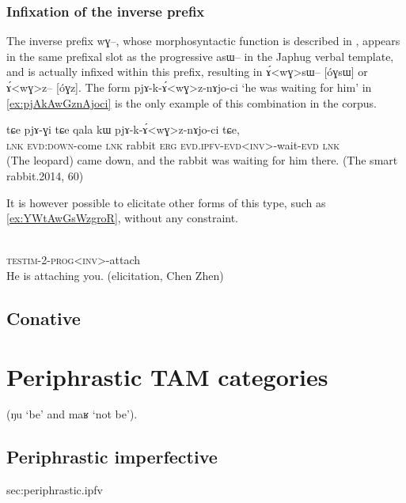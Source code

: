 \documentclass[oldfontcommands,oneside,a4paper,11pt]{article}
\newcommand{\ipa}[1]{{\phon \mbox{#1}}} %
\begin{document}
\subsubsection{Infixation of the inverse prefix}
The inverse prefix \ipa{wɣ--}, whose morphosyntactic function is described in \citet{jacques10inverse}, appears in the same prefixal slot as the progressive \ipa{asɯ--} in the Japhug verbal template, and is actually infixed within this prefix, resulting in \ipa{ɤ́<wɣ>sɯ--} [\ipa{óɣsɯ}] or \ipa{ɤ́<wɣ>z--} [\ipa{óɣz}]. The form \ipa{pjɤ-k-ɤ́<wɣ>z-nɤjo-ci} `he was waiting for him' in \ref{ex:pjAkAwGznAjoci} is the only example of this combination in the corpus.


\begin{exe}
\ex \label{ex:pjAkAwGznAjoci}
\gll
\ipa{tɕe} 	\ipa{pjɤ-ɣi} 	\ipa{tɕe} 	\ipa{qala} 	\ipa{kɯ} 	\ipa{pjɤ-k-ɤ́<wɣ>z-nɤjo-ci} 	\ipa{tɕe,} \\
\textsc{lnk} \textsc{evd:down}-come \textsc{lnk} rabbit \textsc{erg} \textsc{evd.ipfv-evd<inv>}-wait-\textsc{evd} \textsc{lnk} \\
\glt (The leopard) came down, and the rabbit was waiting for him there. (The smart rabbit.2014, 60)
\end{exe}

It is however possible to elicitate other forms of this type, such as \ref{ex:YWtAwGsWzgroR}, without any constraint.

\begin{exe}
\ex  \label{ex:YWtAwGsWzgroR}
\gll  \ipa{ɲɯ-tɯ-ɤ́<wɣ>sɯ-zgroʁ}    \\
\textsc{testim-2-prog<inv>}-attach \\
\glt He is attaching you. (elicitation, Chen Zhen)
\end{exe}

\subsection{Conative}

  
    \section{Periphrastic TAM categories}
  
   (\ipa{ŋu} `be' and \ipa{maʁ} `not be').
   
  \subsection{Periphrastic imperfective} {sec:periphrastic.ipfv}
\end{document}
